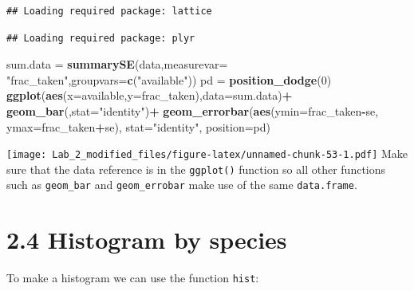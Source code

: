 \documentclass[11pt,]{article}
\newenvironment{Shaded}{\begin{snugshade}}{\end{snugshade}}
\newcommand{\KeywordTok}[1]{\textcolor[rgb]{0.13,0.29,0.53}{\textbf{#1}}}
\newcommand{\DataTypeTok}[1]{\textcolor[rgb]{0.13,0.29,0.53}{#1}}
\newcommand{\DecValTok}[1]{\textcolor[rgb]{0.00,0.00,0.81}{#1}}
\newcommand{\StringTok}[1]{\textcolor[rgb]{0.31,0.60,0.02}{#1}}
\newcommand{\OperatorTok}[1]{\textcolor[rgb]{0.81,0.36,0.00}{\textbf{#1}}}
\newcommand{\NormalTok}[1]{#1}
\begin{document}
\begin{verbatim}
## Loading required package: lattice
\end{verbatim}

\begin{verbatim}
## Loading required package: plyr
\end{verbatim}

\begin{Shaded}
\begin{Highlighting}[]
\NormalTok{sum.data =}\StringTok{ }\KeywordTok{summarySE}\NormalTok{(data,}\DataTypeTok{measurevar=} \StringTok{"frac_taken"}\NormalTok{,}\DataTypeTok{groupvars=}\KeywordTok{c}\NormalTok{(}\StringTok{"available"}\NormalTok{))}
\NormalTok{pd =}\StringTok{ }\KeywordTok{position_dodge}\NormalTok{(}\DecValTok{0}\NormalTok{) }
\KeywordTok{ggplot}\NormalTok{(}\KeywordTok{aes}\NormalTok{(}\DataTypeTok{x=}\NormalTok{available,}\DataTypeTok{y=}\NormalTok{frac_taken),}\DataTypeTok{data=}\NormalTok{sum.data)}\OperatorTok{+}\StringTok{ }
\StringTok{  }\KeywordTok{geom_bar}\NormalTok{(,}\DataTypeTok{stat=}\StringTok{"identity"}\NormalTok{)}\OperatorTok{+}
\StringTok{  }\KeywordTok{geom_errorbar}\NormalTok{(}\KeywordTok{aes}\NormalTok{(}\DataTypeTok{ymin=}\NormalTok{frac_taken}\OperatorTok{-}\NormalTok{se, }\DataTypeTok{ymax=}\NormalTok{frac_taken}\OperatorTok{+}\NormalTok{se),}
                \DataTypeTok{stat=}\StringTok{"identity"}\NormalTok{, }\DataTypeTok{position=}\NormalTok{pd)}
\end{Highlighting}
\end{Shaded}

\texttt{[image: Lab\_2\_modified\_files/figure-latex/unnamed-chunk-53-1.pdf]}
Make sure that the data reference is in the \texttt{ggplot()} function
so all other functions such as \texttt{geom\_bar} and
\texttt{geom\_errobar} make use of the same \texttt{data.frame}.

\section{2.4 Histogram by species}\label{histogram-by-species}

To make a histogram we can use the function \texttt{hist}:

\begin{Shaded}
\end{Shaded}
\end{document}
